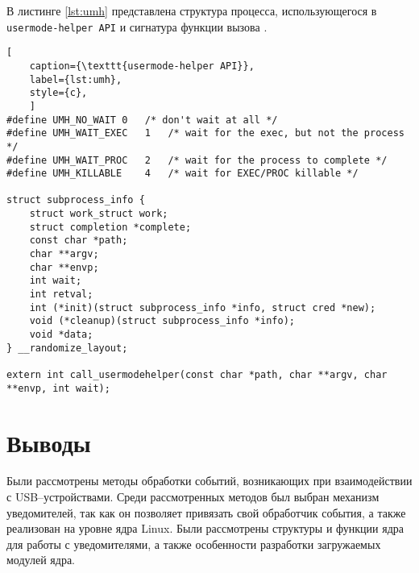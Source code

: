 В листинге \ref{lst:umh} представлена структура процесса, использующегося в \texttt{usermode-helper API} и сигнатура функции вызова \cite{umh}.

\begin{lstlisting}[
	caption={\texttt{usermode-helper API}},
	label={lst:umh},
	style={c},
	]
#define UMH_NO_WAIT	0	/* don't wait at all */
#define UMH_WAIT_EXEC	1	/* wait for the exec, but not the process */
#define UMH_WAIT_PROC	2	/* wait for the process to complete */
#define UMH_KILLABLE	4	/* wait for EXEC/PROC killable */

struct subprocess_info {
	struct work_struct work;
	struct completion *complete;
	const char *path;
	char **argv;
	char **envp;
	int wait;
	int retval;
	int (*init)(struct subprocess_info *info, struct cred *new);
	void (*cleanup)(struct subprocess_info *info);
	void *data;
} __randomize_layout;

extern int call_usermodehelper(const char *path, char **argv, char **envp, int wait);
\end{lstlisting}

\newpage
\section*{Выводы}

Были рассмотрены методы обработки событий, возникающих при взаимодействии с USB--устройствами. Среди рассмотренных методов был выбран механизм уведомителей, так как он позволяет привязать свой обработчик события, а также реализован на уровне ядра Linux. Были рассмотрены структуры и функции ядра для работы с уведомителями, а также особенности разработки загружаемых модулей ядра.